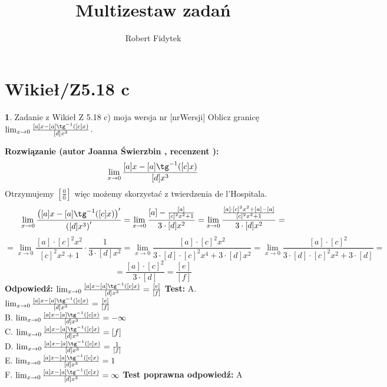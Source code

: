 \documentclass[12pt, a4paper]{article}
\title{Multizestaw zadań}
\author{Robert Fidytek}
\date{}
\theoremstyle{definition} %
\newtheorem{zad}{}
\newcommand{\kategoria}[1]{\section{#1}} %
\newcommand{\zadStart}[1]{\begin{zad}#1\newline} %
\newcommand{\zadStop}{\end{zad}}   %
\newcommand{\rozwStart}[2]{\noindent \textbf{Rozwiązanie (autor #1 , recenzent #2): }\newline} %
\newcommand{\rozwStop}{\newline}                                            %
\newcommand{\odpStart}{\noindent \textbf{Odpowiedź:}\newline}    %
\newcommand{\odpStop}{\newline}                                             %
\newcommand{\testStart}{\noindent \textbf{Test:}\newline} %
\newcommand{\testStop}{\newline} %
\newcommand{\kluczStart}{\noindent \textbf{Test poprawna odpowiedź:}\newline} %
\newcommand{\kluczStop}{\newline} %
\begin{document}
\maketitle


\kategoria{Wikieł/Z5.18 c}
\zadStart{Zadanie z Wikieł Z 5.18 c) moja wersja nr [nrWersji]}
Oblicz granicę $\lim_{x \rightarrow 0} \frac{[a]x-[a] \tg^{-1}([c]x)}{[d]x^3}$.
\zadStop
\rozwStart{Joanna Świerzbin}{}
$$ \lim_{x \rightarrow 0} \frac{[a]x-[a] \tg^{-1}([c]x)}{[d]x^3}$$
Otrzymujemy $ \left[ \frac{0}{0} \right] $ więc możemy skorzystać z twierdzenia de l'Hospitala.
$$ \lim_{x \rightarrow 0} \frac{\left([a]x-[a] \tg^{-1}([c]x)\right)'}{\left([d]x^3\right)'}=\lim_{x \rightarrow 0} \frac{[a]-\frac{[a]}{[c]^2x^2+1}}{3\cdot[d]x^2}=
\lim_{x \rightarrow 0} \frac{\frac{[a]\cdot[c]^2x^2+[a]-[a]}{[c]^2x^2+1}}{3\cdot[d]x^2}=$$
$$=\lim_{x \rightarrow 0} {\frac{[a]\cdot[c]^2x^2}{[c]^2x^2+1}}\cdot{\frac{1}{3\cdot[d]x^2}}= \lim_{x \rightarrow 0} {\frac{[a]\cdot[c]^2x^2}{3\cdot[d]\cdot [c]^2x^4+3\cdot[d]x^2}}= \lim_{x \rightarrow 0} {\frac{[a]\cdot[c]^2}{3\cdot[d]\cdot [c]^2x^2+3\cdot[d]}} =$$
 $$ = \frac{[a]\cdot[c]^2}{3\cdot[d]} = \frac{[e]}{[f]}$$
\rozwStop
\odpStart
$ \lim_{x \rightarrow 0} \frac{[a]x-[a] \tg^{-1}([c]x)}{[d]x^3} =  \frac{[e]}{[f]}$
\odpStop
\testStart
A. $ \lim_{x \rightarrow 0} \frac{[a]x-[a] \tg^{-1}([c]x)}{[d]x^3} =  \frac{[e]}{[f]}$\\
B. $ \lim_{x \rightarrow 0} \frac{[a]x-[a] \tg^{-1}([c]x)}{[d]x^3} =  -\infty$\\
C. $ \lim_{x \rightarrow 0} \frac{[a]x-[a] \tg^{-1}([c]x)}{[d]x^3} =  [f]$\\
D. $ \lim_{x \rightarrow 0} \frac{[a]x-[a] \tg^{-1}([c]x)}{[d]x^3} =  \frac{1}{[f]}$\\
E. $ \lim_{x \rightarrow 0} \frac{[a]x-[a] \tg^{-1}([c]x)}{[d]x^3} =  1$\\
F. $ \lim_{x \rightarrow 0} \frac{[a]x-[a] \tg^{-1}([c]x)}{[d]x^3} =  \infty$
\testStop
\kluczStart
A
\kluczStop
\end{document}
